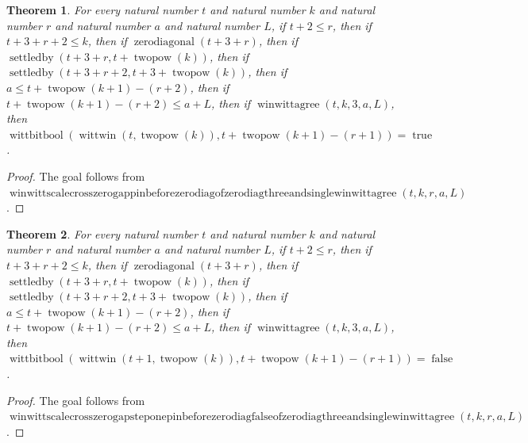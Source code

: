 \documentclass[11pt]{article}
\newtheorem{theorem}{Theorem}[section]
\theoremstyle{definition}
\begin{document}
\begin{theorem}
\label{ll:paper:winwitt-scale-cross-zero-gap-pin-before-zero-diag-of-zero-diag-three-and-single-winwittagree}
For every natural number \(t\) and natural number \(k\) and natural number \(r\) and natural number \(a\) and natural number \(L\), if \(t + 2 \le r\), then if \(t + 3 + r + 2 \le k\), then if \(\operatorname{zerodiagonal}(t + 3 + r)\), then if \(\operatorname{settledby}(t + 3 + r, t + \operatorname{twopow}(k))\), then if \(\operatorname{settledby}(t + 3 + r + 2, t + 3 + \operatorname{twopow}(k))\), then if \(a \le t + \operatorname{twopow}(k + 1) - (r + 2)\), then if \(t + \operatorname{twopow}(k + 1) - (r + 2) \le a + L\), then if \(\operatorname{winwittagree}(t, k, 3, a, L)\), then \(\operatorname{wittbitbool}(\operatorname{wittwin}(t, \operatorname{twopow}(k)), t + \operatorname{twopow}(k + 1) - (r + 1)) = \operatorname{true}\).
\end{theorem}
\begin{proof}
The goal follows from \(\operatorname{winwittscalecrosszerogappinbeforezerodiagofzerodiagthreeandsinglewinwittagree}(t, k, r, a, L)\).
\end{proof}
\begin{theorem}
\label{ll:paper:winwitt-scale-cross-zero-gap-step-one-pin-before-zero-diag-false-of-zero-diag-three-and-single-winwittagree}
For every natural number \(t\) and natural number \(k\) and natural number \(r\) and natural number \(a\) and natural number \(L\), if \(t + 2 \le r\), then if \(t + 3 + r + 2 \le k\), then if \(\operatorname{zerodiagonal}(t + 3 + r)\), then if \(\operatorname{settledby}(t + 3 + r, t + \operatorname{twopow}(k))\), then if \(\operatorname{settledby}(t + 3 + r + 2, t + 3 + \operatorname{twopow}(k))\), then if \(a \le t + \operatorname{twopow}(k + 1) - (r + 2)\), then if \(t + \operatorname{twopow}(k + 1) - (r + 2) \le a + L\), then if \(\operatorname{winwittagree}(t, k, 3, a, L)\), then \(\operatorname{wittbitbool}(\operatorname{wittwin}(t + 1, \operatorname{twopow}(k)), t + \operatorname{twopow}(k + 1) - (r + 1)) = \operatorname{false}\).
\end{theorem}
\begin{proof}
The goal follows from \(\operatorname{winwittscalecrosszerogapsteponepinbeforezerodiagfalseofzerodiagthreeandsinglewinwittagree}(t, k, r, a, L)\).
\end{proof}
\end{document}

